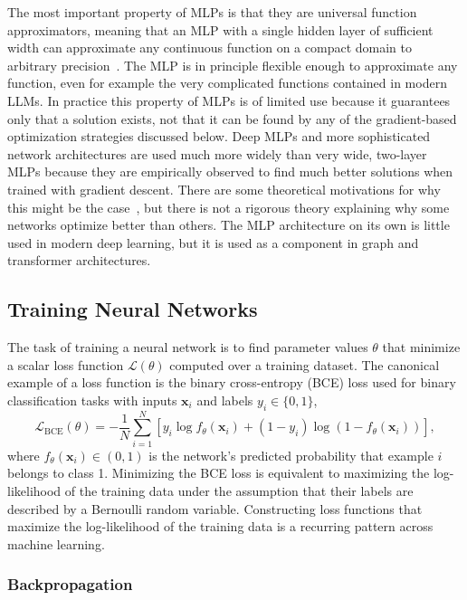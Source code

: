 The most important property of MLPs is that they are universal function approximators, meaning that an MLP with a single hidden layer of sufficient width can approximate any continuous function on a compact domain to arbitrary precision~\cite{cybenko1989approximation,hornik1989multilayer}.
The MLP is in principle flexible enough to approximate any function, even for example the very complicated functions contained in modern LLMs.
In practice this property of MLPs is of limited use because it guarantees only that a solution exists, not that it can be found by any of the gradient-based optimization strategies discussed below.
Deep MLPs and more sophisticated network architectures are used much more widely than very wide, two-layer MLPs because they are empirically observed to find much better solutions when trained with gradient descent.
There are some theoretical motivations for why this might be the case~\cite{jacot2018neural}, but there is not a rigorous theory explaining why some networks optimize better than others.
The MLP architecture on its own is little used in modern deep learning, but it is used as a component in graph and transformer architectures.

\subsection{Training Neural Networks}
\label{sec:training}

The task of training a neural network is to find parameter values $\theta$ that minimize a scalar loss function $\mathcal{L}(\theta)$ computed over a training dataset.
The canonical example of a loss function is the binary cross-entropy (BCE) loss used for binary classification tasks with inputs $\mathbf{x}_i$ and labels $y_i \in \{0, 1\}$,
\begin{equation}
    \mathcal{L}_{\text{BCE}}(\theta) = -\frac{1}{N} \sum_{i=1}^{N} \left[ y_i \log f_\theta(\mathbf{x}_i) + (1 - y_i) \log\!\left(1 - f_\theta(\mathbf{x}_i)\right) \right],
    \label{eqn:bce}
\end{equation}
where $f_\theta(\mathbf{x}_i) \in (0,1)$ is the network's predicted probability that example $i$ belongs to class 1.
Minimizing the BCE loss is equivalent to maximizing the log-likelihood of the training data under the assumption that their labels are described by a Bernoulli random variable.
Constructing loss functions that maximize the log-likelihood of the training data is a recurring pattern across machine learning.

\subsubsection{Backpropagation}

